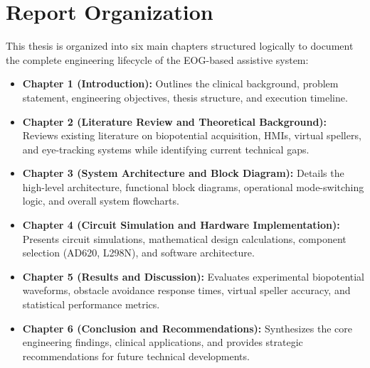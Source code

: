 \section{Report Organization}
\label{sec:report_organization}

This thesis is organized into six main chapters structured logically to document the complete engineering lifecycle of the EOG-based assistive system:

\begin{itemize}
    \item \textbf{Chapter 1 (Introduction):} Outlines the clinical background, problem statement, engineering objectives, thesis structure, and execution timeline.
    \item \textbf{Chapter 2 (Literature Review and Theoretical Background):} Reviews existing literature on biopotential acquisition, HMIs, virtual spellers, and eye-tracking systems while identifying current technical gaps.
    \item \textbf{Chapter 3 (System Architecture and Block Diagram):} Details the high-level architecture, functional block diagrams, operational mode-switching logic, and overall system flowcharts.
    \item \textbf{Chapter 4 (Circuit Simulation and Hardware Implementation):} Presents circuit simulations, mathematical design calculations, component selection (AD620, L298N), and software architecture.
    \item \textbf{Chapter 5 (Results and Discussion):} Evaluates experimental biopotential waveforms, obstacle avoidance response times, virtual speller accuracy, and statistical performance metrics.
    \item \textbf{Chapter 6 (Conclusion and Recommendations):} Synthesizes the core engineering findings, clinical applications, and provides strategic recommendations for future technical developments.
\end{itemize}
